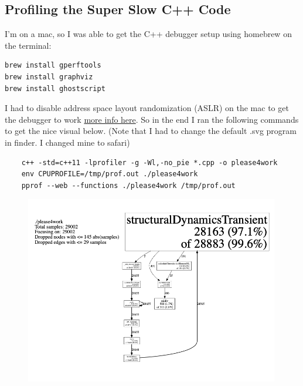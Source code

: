 \documentclass{article}
\begin{document}
\subsection{Profiling the Super Slow C++ Code}

I'm on a mac, so I was able to get the C++ debugger setup using homebrew on the terminal:

\begin{verbatim}
brew install gperftools
brew install graphviz
brew install ghostscript
\end{verbatim}


I had to disable address space layout randomization (ASLR) on the mac to get the debugger to work \href{https://stackoverflow.com/questions/10562280/line-number-in-google-perftools-cpu-profiler-on-macosx}{more info here}.  So in the end I ran the following commands to get the nice visual below. (Note that I had to change the default .svg program in finder.  I changed mine to safari)\\

\begin{verbatim}
    c++ -std=c++11 -lprofiler -g -Wl,-no_pie *.cpp -o please4work
    env CPUPROFILE=/tmp/prof.out ./please4work
    pprof --web --functions ./please4work /tmp/prof.out
\end{verbatim}

\begin{figure}[H]
\centering
\vspace{-12pt}
\includegraphics[width=0.99\textwidth]{../figs/profiler_output.png}
\vspace{-12pt}
\label{fig:ac_idx}
\end{figure}
\end{document}
